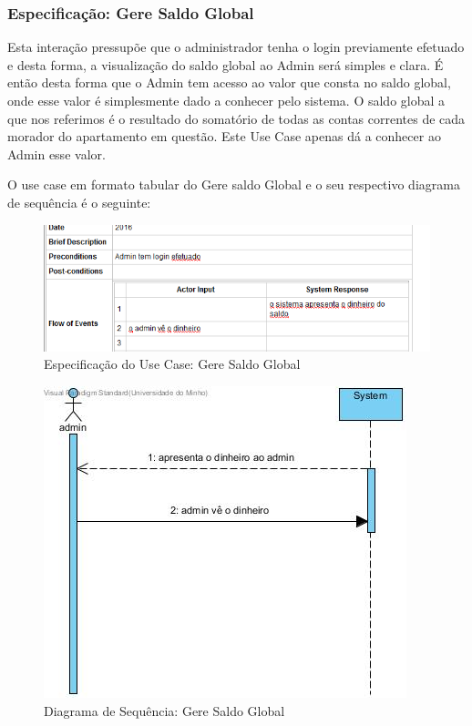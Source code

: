 \newpage
\subsubsection{Especificação: Gere Saldo Global }

Esta interação pressupõe que o administrador  tenha o login previamente efetuado e desta forma, a visualização do saldo global ao Admin será simples e clara. É então desta forma que o Admin tem acesso ao valor que consta no saldo global, onde esse valor é simplesmente dado a conhecer pelo sistema. O saldo global a que nos referimos é o resultado do somatório de todas as contas correntes de cada morador do apartamento em questão. Este Use Case apenas dá a conhecer ao Admin esse valor.

O use case em formato tabular do Gere saldo Global e o seu respectivo diagrama de sequência é o seguinte:

\begin{figure}[htb!]
	\centering
	\includegraphics[scale=0.6]{imagens/Especificacoes/geresaldoglobal}  
	\caption{Especificação do Use Case: Gere Saldo Global  }  
\end{figure}

\begin{figure}[htb!]
	\centering
	\includegraphics[scale=0.5]{imagens/diagramaSeq/GereSaldoGlobal}  
	\caption{Diagrama de Sequência: Gere Saldo Global}  
\end{figure}



